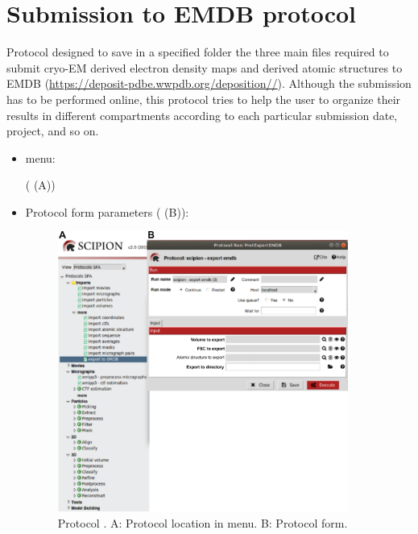 \section{Submission to EMDB protocol}
\label{app:exportToEMDB}

Protocol designed to save in a specified folder the three main files required to submit cryo-EM derived electron density maps and derived atomic structures to EMDB (\url{https://deposit-pdbe.wwpdb.org/deposition//}). Although the submission has to be performed online, this protocol tries to help the user to organize their results in different compartments according to each particular submission date, project, and so on.

 \begin{itemize}
  \item \scipion menu:
  
     ( (A))
  
  \item Protocol form parameters ( (B)):
  
    \begin{figure}[H]
     \centering 
     \captionsetup{width=.7\linewidth} 
     \includegraphics[width=0.90\textwidth]{Images_appendix/Fig156.pdf}
     \caption{Protocol . A: Protocol location in \scipion menu. B: Protocol form.}
     \label{fig:export_to_EMDB_1}
    \end{figure}
    

\end{itemize}
